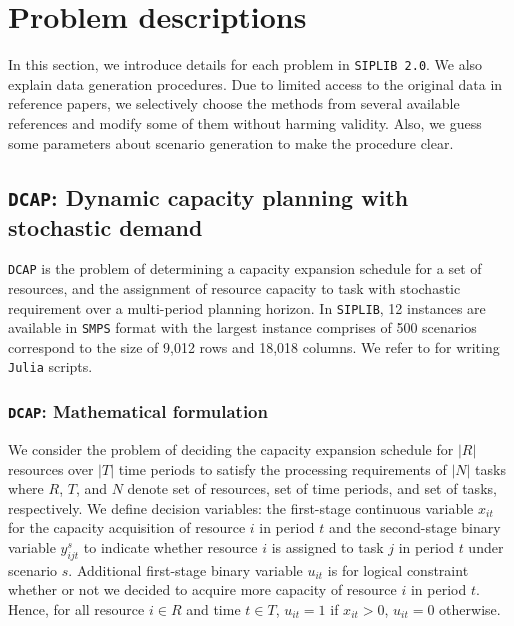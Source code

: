 \section{Problem descriptions} \label{sec:prob_desc}

In this section, we introduce details for each problem in \texttt{SIPLIB 2.0}. We also explain data generation procedures. Due to limited access to the original data in reference papers, we selectively choose the methods from several available references and modify some of them without harming validity. Also, we guess some parameters about scenario generation to make the procedure clear.  %

\subsection{\texttt{DCAP}: Dynamic capacity planning with stochastic demand} \label{DCAP}
\texttt{DCAP} is the problem of determining a capacity expansion schedule for a set of resources, and the assignment of resource capacity to task with stochastic requirement over a multi-period planning horizon. In \texttt{SIPLIB}, 12 instances are available in \texttt{SMPS} format with the largest instance comprises of 500 scenarios correspond to the size of 9,012 rows and 18,018 columns. We refer to \cite{journal:AG2004} for writing \texttt{Julia} scripts.
\subsubsection{\texttt{DCAP}: Mathematical formulation}
We consider the problem of deciding the capacity expansion schedule for $|R|$ resources over $|T|$ time periods to satisfy the processing requirements of $|N|$ tasks where $R$, $T$, and $N$ denote set of resources, set of time periods, and set of tasks, respectively. We define decision variables: the first-stage continuous variable $x_{it}$ for the capacity acquisition of resource $i$ in period $t$ and the second-stage binary variable $y_{ijt}^s$ to indicate whether resource $i$ is assigned to task $j$ in period $t$ under scenario $s$. Additional first-stage binary variable $u_{it}$ is for logical constraint whether or not we decided to acquire more capacity of resource $i$ in period $t$. Hence, for all resource $i\in R$ and time $t\in T$, $u_{it}=1$ if $x_{it}>0$, $u_{it}=0$ otherwise. 


